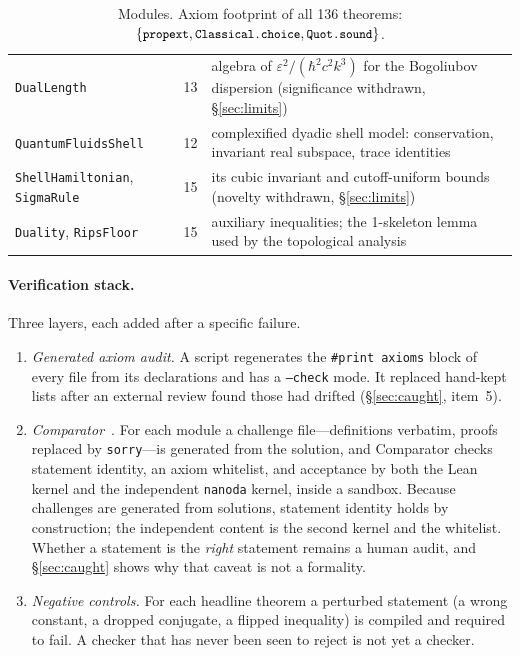 \documentclass[11pt,a4paper]{article}
\theoremstyle{definition}
\newcommand{\lean}[1]{\texttt{\small #1}}
\begin{document}
\begin{table}[h]
\begin{tabular}{@{}llp{8.6cm}@{}}
\lean{DualLength} & 13 & algebra of $\varepsilon^2/(\hbar^2c^2k^3)$ for the Bogoliubov
  dispersion (significance withdrawn, \S\ref{sec:limits}) \\
\lean{QuantumFluidsShell} & 12 & complexified dyadic shell model: conservation, invariant
  real subspace, trace identities \\
\lean{ShellHamiltonian}, \lean{SigmaRule} & 15 & its cubic invariant and cutoff-uniform
  bounds (novelty withdrawn, \S\ref{sec:limits}) \\
\lean{Duality}, \lean{RipsFloor} & 15 & auxiliary inequalities; the 1-skeleton lemma used by
  the topological analysis \\
\bottomrule
\end{tabular}
\caption{Modules. Axiom footprint of all 136 theorems:
$\{\lean{propext}, \lean{Classical.choice}, \lean{Quot.sound}\}$.}
\label{tab:modules}
\end{table}

\paragraph{Verification stack.} Three layers, each added after a specific failure.
\begin{enumerate}[leftmargin=*,itemsep=2pt]
\item \emph{Generated axiom audit.} A script regenerates the \lean{\#print axioms} block of
  every file from its declarations and has a \lean{--check} mode. It replaced hand-kept
  lists after an external review found those had drifted (\S\ref{sec:caught}, item~5).
\item \emph{Comparator}~\cite{Comparator}. For each module a challenge file---definitions
  verbatim, proofs replaced by \lean{sorry}---is generated from the solution, and Comparator
  checks statement identity, an axiom whitelist, and acceptance by both the Lean kernel and
  the independent \lean{nanoda} kernel, inside a sandbox. Because challenges are generated
  from solutions, statement identity holds by construction; the independent content is the
  second kernel and the whitelist. Whether a statement is the \emph{right} statement remains
  a human audit, and \S\ref{sec:caught} shows why that caveat is not a formality.
\item \emph{Negative controls.} For each headline theorem a perturbed statement (a wrong
  constant, a dropped conjugate, a flipped inequality) is compiled and required to fail. A
  checker that has never been seen to reject is not yet a checker.
\end{enumerate}
\end{document}
